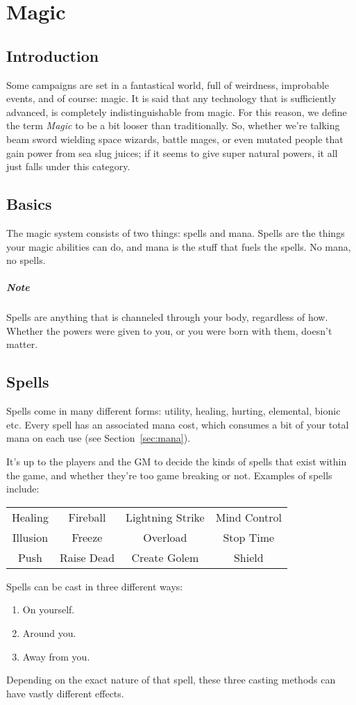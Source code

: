 \chapter{Magic} \label{chap:magic}
\section{Introduction}
Some campaigns are set in a fantastical world, full of weirdness, improbable events, and of course: magic.
It is said that any technology that is sufficiently advanced, is completely indistinguishable from magic.
For this reason, we define the term \textit{Magic} to be a bit looser than traditionally.
So, whether we're talking beam sword wielding space wizards, battle mages, or even mutated people that gain power from sea slug juices;
if it seems to give super natural powers, it all just falls under this category.

\section{Basics}
The magic system consists of two things: spells and mana.
Spells are the things your magic abilities can do, and mana is the stuff that fuels the spells.
No mana, no spells.

\paragraph{Note} Spells are anything that is channeled through your body, regardless of how.
Whether the powers were given to you, or you were born with them, doesn't matter.

\section{Spells}
Spells come in many different forms: utility, healing, hurting, elemental, bionic etc.
Every spell has an associated mana cost, which consumes a bit of your total mana on each use (see Section~\ref{sec:mana}).

It's up to the players and the GM to decide the kinds of spells that exist within the game, and whether they're too game breaking or not.
Examples of spells include:
\begin{center}
  \begin{tabular}{c|c|c|c}
    Healing & Fireball & Lightning Strike & Mind Control \\
    Illusion & Freeze & Overload & Stop Time \\
    Push & Raise Dead & Create Golem & Shield
  \end{tabular}
\end{center}
Spells can be cast in three different ways:
\begin{enumerate}
\item On yourself.
\item Around you.
\item Away from you.
\end{enumerate}
Depending on the exact nature of that spell, these three casting methods can have vastly different effects.

